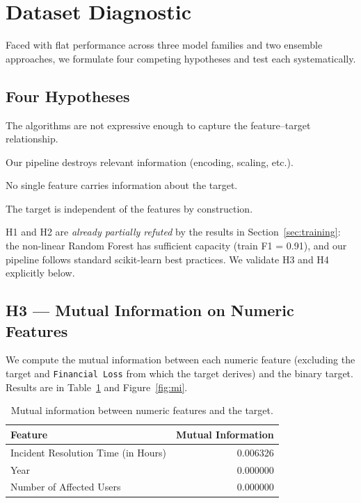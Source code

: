 \documentclass[a4paper,12pt]{article}
\begin{document}
\section{Dataset Diagnostic}
\label{sec:diagnostic}

Faced with flat performance across three model families and two ensemble approaches, we formulate four competing hypotheses and test each systematically.

\subsection{Four Hypotheses}

\begin{description}[leftmargin=2cm]
    \item[H1 --- Insufficient model capacity.] The algorithms are not expressive enough to capture the feature--target relationship.
    \item[H2 --- Inadequate preprocessing.] Our pipeline destroys relevant information (encoding, scaling, etc.).
    \item[H3 --- Individually uninformative features.] No single feature carries information about the target.
    \item[H4 --- Structurally random dataset.] The target is independent of the features by construction.
\end{description}

H1 and H2 are \emph{already partially refuted} by the results in Section~\ref{sec:training}: the non-linear Random Forest has sufficient capacity (train F1 = 0.91), and our pipeline follows standard scikit-learn best practices. We validate H3 and H4 explicitly below.

\subsection{H3 --- Mutual Information on Numeric Features}

We compute the mutual information between each numeric feature (excluding the target and \texttt{Financial Loss} from which the target derives) and the binary target. Results are in Table~\ref{tab:mi} and Figure~\ref{fig:mi}.

\begin{table}[H]
\centering
\caption{Mutual information between numeric features and the target.}
\label{tab:mi}
\begin{tabular}{lr}
\toprule
\textbf{Feature} & \textbf{Mutual Information} \\
\midrule
Incident Resolution Time (in Hours) & 0.006326 \\
Year                                 & 0.000000 \\
Number of Affected Users             & 0.000000 \\
\bottomrule
\end{tabular}
\end{table}
\end{document}
